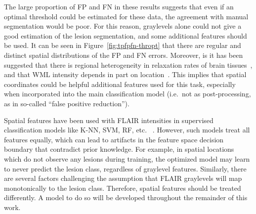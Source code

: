 \par
The large proportion of FP and FN in these results suggests that 
even if an optimal threshold could be estimated for these data,
the agreement with manual segmentation would be poor.
For this reason, graylevels alone could not give a good estimation
of the lesion segmentation,
and some additional features should be used.
It can be seen in Figure~\ref{fig:tpfpfn-thropt} that there are
regular and distinct spatial distributions of the FP and FN errors.
Moreover, is it has been suggested that there is
regional heterogeneity in relaxation rates of brain tissues~\cite{Sled2004},
and that WML intensity depends in part on location~\cite{Stevenson2000,Harmouche2015}.
This implies that spatial coordinates could be helpful additional features used for this task,
especially when incorporated into the main classification model
(i.e.\ not as post-processing, as in so-called ``false positive reduction'').
\par
Spatial features have been used with FLAIR intensities
in supervised classification models like K-NN, SVM, RF, etc.%
~\cite{Anbeek2004,Anbeek2005,Dyrby2008,Griffanti2016,Dadar2017}.
However, such models treat all features equally,
which can lead to artifacts in the feature space decision boundary that contradict prior knowledge.
For example, in spatial locations which do not observe any lesions during training,
the optimized model may learn to never predict the lesion class, regardless of graylevel features.
Similarly, there are several factors challenging the assumption 
that FLAIR graylevels will map monotonically to the lesion class.
Therefore, spatial features should be treated differently.
A model to do so will be developed throughout the remainder of this work.
